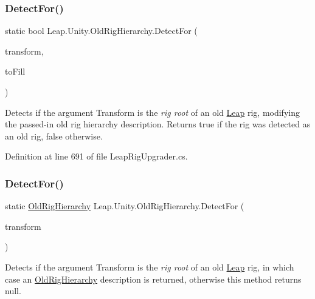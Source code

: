 \subsubsection{\texorpdfstring{DetectFor()}{DetectFor()}\hspace{0.1cm}{\footnotesize\ttfamily [1/2]}}
{\footnotesize\ttfamily static bool Leap.\+Unity.\+Old\+Rig\+Hierarchy.\+Detect\+For (\begin{DoxyParamCaption}\item[{Transform}]{transform,  }\item[{\mbox{\hyperlink{class_leap_1_1_unity_1_1_old_rig_hierarchy}{Old\+Rig\+Hierarchy}}}]{to\+Fill }\end{DoxyParamCaption})\hspace{0.3cm}{\ttfamily [static]}}



Detects if the argument Transform is the {\itshape rig root} of an old \mbox{\hyperlink{namespace_leap_1_1_unity_1_1_leap}{Leap}} rig, modifying the passed-\/in old rig hierarchy description. Returns true if the rig was detected as an old rig, false otherwise. 



Definition at line 691 of file Leap\+Rig\+Upgrader.\+cs.

\mbox{\label{class_leap_1_1_unity_1_1_old_rig_hierarchy_a07e5376d38915dc8ad63759188cc57e8}} 
\subsubsection{\texorpdfstring{DetectFor()}{DetectFor()}\hspace{0.1cm}{\footnotesize\ttfamily [2/2]}}
{\footnotesize\ttfamily static \mbox{\hyperlink{class_leap_1_1_unity_1_1_old_rig_hierarchy}{Old\+Rig\+Hierarchy}} Leap.\+Unity.\+Old\+Rig\+Hierarchy.\+Detect\+For (\begin{DoxyParamCaption}\item[{Transform}]{transform }\end{DoxyParamCaption})\hspace{0.3cm}{\ttfamily [static]}}



Detects if the argument Transform is the {\itshape rig root} of an old \mbox{\hyperlink{namespace_leap_1_1_unity_1_1_leap}{Leap}} rig, in which case an \mbox{\hyperlink{class_leap_1_1_unity_1_1_old_rig_hierarchy}{Old\+Rig\+Hierarchy}} description is returned, otherwise this method returns null. 



